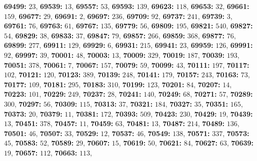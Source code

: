 \textsf{\bfseries 69499:} $23$, \textsf{\bfseries 69539:} $13$, \textsf{\bfseries 69557:} $53$, \textsf{\bfseries 69593:} $139$, \textsf{\bfseries 69623:} $118$, \textsf{\bfseries 69653:} $32$, \textsf{\bfseries 69661:} $159$, \textsf{\bfseries 69677:} $29$, \textsf{\bfseries 69691:} $2$, \textsf{\bfseries 69697:} $236$, \textsf{\bfseries 69709:} $92$, \textsf{\bfseries 69737:} $241$, \textsf{\bfseries 69739:} $3$, \textsf{\bfseries 69761:} $76$, \textsf{\bfseries 69763:} $61$, \textsf{\bfseries 69767:} $135$, \textsf{\bfseries 69779:} $56$, \textsf{\bfseries 69809:} $195$, \textsf{\bfseries 69821:} $540$, \textsf{\bfseries 69827:} $54$, \textsf{\bfseries 69829:} $38$, \textsf{\bfseries 69833:} $37$, \textsf{\bfseries 69847:} $79$, \textsf{\bfseries 69857:} $266$, \textsf{\bfseries 69859:} $368$, \textsf{\bfseries 69877:} $76$, \textsf{\bfseries 69899:} $277$, \textsf{\bfseries 69911:} $129$, \textsf{\bfseries 69929:} $6$, \textsf{\bfseries 69931:} $215$, \textsf{\bfseries 69941:} $23$, \textsf{\bfseries 69959:} $126$, \textsf{\bfseries 69991:} $92$, \textsf{\bfseries 69997:} $39$, \textsf{\bfseries 70001:} $48$, \textsf{\bfseries 70003:} $13$, \textsf{\bfseries 70009:} $329$, \textsf{\bfseries 70019:} $187$, \textsf{\bfseries 70039:} $193$, \textsf{\bfseries 70051:} $378$, \textsf{\bfseries 70061:} $7$, \textsf{\bfseries 70067:} $157$, \textsf{\bfseries 70079:} $59$, \textsf{\bfseries 70099:} $43$, \textsf{\bfseries 70111:} $197$, \textsf{\bfseries 70117:} $102$, \textsf{\bfseries 70121:} $120$, \textsf{\bfseries 70123:} $389$, \textsf{\bfseries 70139:} $248$, \textsf{\bfseries 70141:} $179$, \textsf{\bfseries 70157:} $243$, \textsf{\bfseries 70163:} $73$, \textsf{\bfseries 70177:} $109$, \textsf{\bfseries 70181:} $295$, \textsf{\bfseries 70183:} $310$, \textsf{\bfseries 70199:} $123$, \textsf{\bfseries 70201:} $84$, \textsf{\bfseries 70207:} $14$, \textsf{\bfseries 70223:} $101$, \textsf{\bfseries 70229:} $249$, \textsf{\bfseries 70237:} $28$, \textsf{\bfseries 70241:} $140$, \textsf{\bfseries 70249:} $68$, \textsf{\bfseries 70271:} $57$, \textsf{\bfseries 70289:} $300$, \textsf{\bfseries 70297:} $56$, \textsf{\bfseries 70309:} $115$, \textsf{\bfseries 70313:} $37$, \textsf{\bfseries 70321:} $184$, \textsf{\bfseries 70327:} $35$, \textsf{\bfseries 70351:} $165$, \textsf{\bfseries 70373:} $20$, \textsf{\bfseries 70379:} $11$, \textsf{\bfseries 70381:} $172$, \textsf{\bfseries 70393:} $509$, \textsf{\bfseries 70423:} $230$, \textsf{\bfseries 70429:} $19$, \textsf{\bfseries 70439:} $13$, \textsf{\bfseries 70451:} $378$, \textsf{\bfseries 70457:} $11$, \textsf{\bfseries 70459:} $63$, \textsf{\bfseries 70481:} $13$, \textsf{\bfseries 70487:} $214$, \textsf{\bfseries 70489:} $136$, \textsf{\bfseries 70501:} $46$, \textsf{\bfseries 70507:} $33$, \textsf{\bfseries 70529:} $12$, \textsf{\bfseries 70537:} $46$, \textsf{\bfseries 70549:} $138$, \textsf{\bfseries 70571:} $337$, \textsf{\bfseries 70573:} $45$, \textsf{\bfseries 70583:} $52$, \textsf{\bfseries 70589:} $29$, \textsf{\bfseries 70607:} $15$, \textsf{\bfseries 70619:} $50$, \textsf{\bfseries 70621:} $84$, \textsf{\bfseries 70627:} $63$, \textsf{\bfseries 70639:} $19$, \textsf{\bfseries 70657:} $112$, \textsf{\bfseries 70663:} $113$, 
